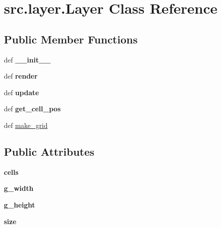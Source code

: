 \hypertarget{classsrc_1_1layer_1_1_layer}{\section{src.\-layer.\-Layer \-Class \-Reference}
\label{classsrc_1_1layer_1_1_layer}
}
\subsection*{\-Public \-Member \-Functions}
\begin{DoxyCompactItemize}
\item 
\hypertarget{classsrc_1_1layer_1_1_layer_a137dd7de61769f9f7f0f0cc57bdb2b00}{def {\bfseries \-\_\-\-\_\-init\-\_\-\-\_\-}}\label{classsrc_1_1layer_1_1_layer_a137dd7de61769f9f7f0f0cc57bdb2b00}

\item 
\hypertarget{classsrc_1_1layer_1_1_layer_a31ca33b8eba527ee2f50cb8c2c58a0f0}{def {\bfseries render}}\label{classsrc_1_1layer_1_1_layer_a31ca33b8eba527ee2f50cb8c2c58a0f0}

\item 
\hypertarget{classsrc_1_1layer_1_1_layer_a9ee40e5e48252fc2f86d41ecce639796}{def {\bfseries update}}\label{classsrc_1_1layer_1_1_layer_a9ee40e5e48252fc2f86d41ecce639796}

\item 
\hypertarget{classsrc_1_1layer_1_1_layer_ab7de06d6087fe89e3db18795777d2c03}{def {\bfseries get\-\_\-cell\-\_\-pos}}\label{classsrc_1_1layer_1_1_layer_ab7de06d6087fe89e3db18795777d2c03}

\item 
def \hyperlink{classsrc_1_1layer_1_1_layer_aa173e4625a648a7c774aa9f6c8fb4e65}{make\-\_\-grid}
\end{DoxyCompactItemize}
\subsection*{\-Public \-Attributes}
\begin{DoxyCompactItemize}
\item 
\hypertarget{classsrc_1_1layer_1_1_layer_adcc71aa60154f088a91e05778c2ec1d7}{{\bfseries cells}}\label{classsrc_1_1layer_1_1_layer_adcc71aa60154f088a91e05778c2ec1d7}

\item 
\hypertarget{classsrc_1_1layer_1_1_layer_a1177ea9bed88fb367c91bad8f7a4a384}{{\bfseries g\-\_\-width}}\label{classsrc_1_1layer_1_1_layer_a1177ea9bed88fb367c91bad8f7a4a384}

\item 
\hypertarget{classsrc_1_1layer_1_1_layer_a75f33b5f040b34e7c794e391cef7c5f8}{{\bfseries g\-\_\-height}}\label{classsrc_1_1layer_1_1_layer_a75f33b5f040b34e7c794e391cef7c5f8}

\item 
\hypertarget{classsrc_1_1layer_1_1_layer_abfd5920bd67e111cfdf53262bb6ee491}{{\bfseries size}}\label{classsrc_1_1layer_1_1_layer_abfd5920bd67e111cfdf53262bb6ee491}

\end{DoxyCompactItemize}


